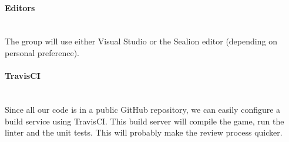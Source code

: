 \paragraph{Editors}
~\\ The group will use either Visual Studio or the Sealion editor (depending on personal preference). 

\paragraph{TravisCI}
~\\ Since all our code is in a public GitHub repository, we can easily configure a build service using TravisCI. This build server will compile the game, run the linter and the unit tests. This will probably make the review process quicker.
 


